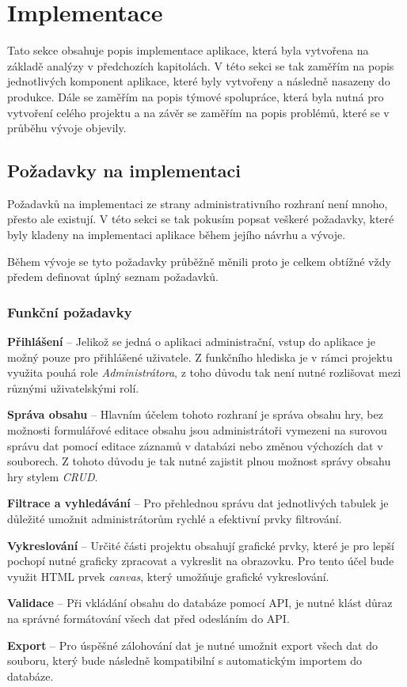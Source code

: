 \chapter{Implementace}
\label{ch:implementation}
Tato sekce obsahuje popis implementace aplikace, která byla vytvořena na základě analýzy v předchozích kapitolách. V této sekci se tak zaměřím na popis jednotlivých komponent aplikace, které byly vytvořeny a následně nasazeny do produkce. Dále se zaměřím na popis týmové spolupráce, která byla nutná pro vytvoření celého projektu a na závěr se zaměřím na popis problémů, které se v průběhu vývoje objevily.

\section{Požadavky na implementaci}
\label{sec:implementation-requirements}
Požadavků na implementaci ze strany administrativního rozhraní není mnoho, přesto ale existují. V této sekci se tak pokusím popsat veškeré požadavky, které byly kladeny na implementaci aplikace během jejího návrhu a vývoje.

Během vývoje se tyto požadavky průběžně měnili proto je celkem obtížné vždy předem definovat úplný seznam požadavků.

\subsection*{Funkční požadavky}
\label{subsec:implementation-requirements-functional}

\begin{description}
    \item \textbf{Přihlášení} -- Jelikož se jedná o aplikaci administrační, vstup do aplikace je možný pouze pro přihlášené uživatele. Z funkčního hlediska je v rámci projektu využita pouhá role \textit{Administrátora}, z toho důvodu tak není nutné rozlišovat mezi různými uživatelskými rolí.
    \item \textbf{Správa obsahu} -- Hlavním účelem tohoto rozhraní je správa obsahu hry, bez možnosti formulářové editace obsahu jsou administrátoři vymezeni na surovou správu dat pomocí editace záznamů v databázi nebo změnou výchozích dat v souborech. Z tohoto důvodu je tak nutné zajistit plnou možnost správy obsahu hry stylem \textit{CRUD}.
    \item \textbf{Filtrace a vyhledávání} -- Pro přehlednou správu dat jednotlivých tabulek je důležité umožnit administrátorům rychlé a efektivní prvky filtrování.
    \item \textbf{Vykreslování} -- Určité části projektu obsahují grafické prvky, které je pro lepší pochopí nutné graficky zpracovat a vykreslit na obrazovku. Pro tento účel bude využit HTML prvek \textit{canvas}, který umožňuje grafické vykreslování.
    \item \textbf{Validace} -- Při vkládání obsahu do databáze pomocí API, je nutné klást důraz na správné formátování všech dat před odesláním do API\@.
    \item \textbf{Export} -- Pro úspěšné zálohování dat je nutné umožnit export všech dat do souboru, který bude následně kompatibilní s automatickým importem do databáze.
\end{description}

